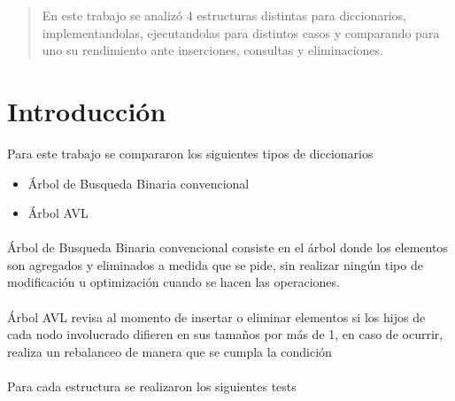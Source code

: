 \documentclass[12pt,letterpaper,hidelinks]{extarticle}
\begin{document}
\renewcommand{\sectionmark}[1]{\markright{\thesection.\ #1}}
\renewcommand{\headrulewidth}{0.5pt}

%

\begin{abstract}
   En este trabajo se analizó 4 estructuras distintas para diccionarios, implementandolas,
	 ejecutandolas para distintos casos y comparando para uno su rendimiento ante inserciones, consultas y eliminaciones.
\end{abstract}
\section{Introducción}
Para este trabajo se compararon los siguientes tipos de diccionarios
	\begin{itemize}
			\item Árbol de Busqueda Binaria convencional
			\item Árbol AVL
	\end{itemize}
	\paragraph{} Árbol de Busqueda Binaria convencional consiste en el árbol donde los elementos son agregados y eliminados a medida que
	se pide, sin realizar ningún tipo de modificación u optimización cuando se hacen las operaciones.
	\paragraph{} Árbol AVL revisa al momento de insertar o eliminar elementos si los hijos de cada nodo involucrado difieren en sus tamaños por
	más de 1, en caso de ocurrir, realiza un rebalanceo de manera que se cumpla la condición


 \paragraph{}Para cada estructura se realizaron los siguientes tests
\end{document}
